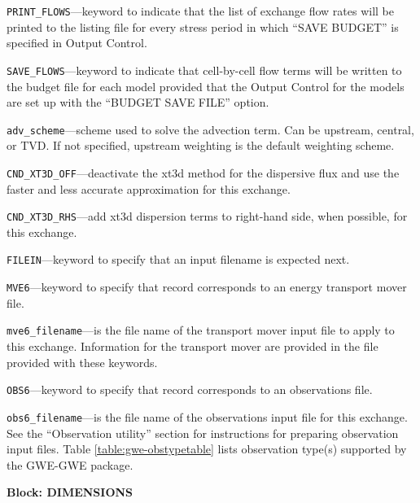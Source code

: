 \begin{description}
\item \texttt{PRINT\_FLOWS}---keyword to indicate that the list of exchange flow rates will be printed to the listing file for every stress period in which ``SAVE BUDGET'' is specified in Output Control.

\item \texttt{SAVE\_FLOWS}---keyword to indicate that cell-by-cell flow terms will be written to the budget file for each model provided that the Output Control for the models are set up with the ``BUDGET SAVE FILE'' option.

\item \texttt{adv\_scheme}---scheme used to solve the advection term.  Can be upstream, central, or TVD.  If not specified, upstream weighting is the default weighting scheme.

\item \texttt{CND\_XT3D\_OFF}---deactivate the xt3d method for the dispersive flux and use the faster and less accurate approximation for this exchange.

\item \texttt{CND\_XT3D\_RHS}---add xt3d dispersion terms to right-hand side, when possible, for this exchange.

\item \texttt{FILEIN}---keyword to specify that an input filename is expected next.

\item \texttt{MVE6}---keyword to specify that record corresponds to an energy transport mover file.

\item \texttt{mve6\_filename}---is the file name of the transport mover input file to apply to this exchange.  Information for the transport mover are provided in the file provided with these keywords.

\item \texttt{OBS6}---keyword to specify that record corresponds to an observations file.

\item \texttt{obs6\_filename}---is the file name of the observations input file for this exchange. See the ``Observation utility'' section for instructions for preparing observation input files. Table \ref{table:gwe-obstypetable} lists observation type(s) supported by the GWE-GWE package.

\end{description}
\item \textbf{Block: DIMENSIONS}


